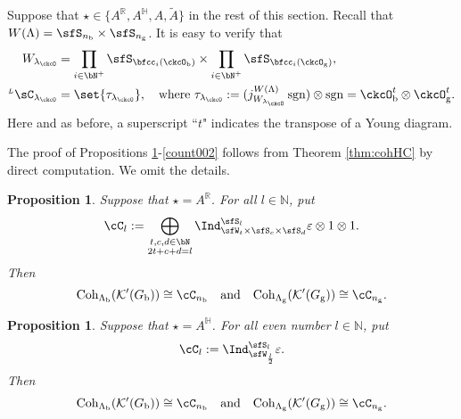 \documentclass[12pt]{amsart}
\newcommand{\BH}{{\mathbb {H}}}
\newcommand{\BN}{{\mathbb {N}}}
\newcommand{\CK}{{\mathcal {K}}}
\newcommand{\sgn}{\operatorname{sgn}}
\newcommand{\R}{\mathbb R}
\numberwithin{equation}{section}
\newtheorem{prop}[thm]{Proposition}
\theoremstyle{remark}
\def\dBV{d_{\mathrm{BV}}}
\def\lamck{\lambda_\ckcO}
\def\LC{{}^{\scriptscriptstyle L}\sC}
\def\LRC{{}^{\scriptscriptstyle LR}\sC}
\def\AND{\quad \text{and} \quad}
\def\Coh{\mathrm{Coh}}
\def\ckcOb{\ckcO_{\mathrm b}}
\def\ckcOg{\ckcO_{\mathrm g}}
\begin{document}


Suppose that $\star\in  \{A^\R, A^\BH, A, \widetilde A\}$ in the rest of this section.
Recall that  $W(\Lambda)  = \sfS_{n_{\mathrm b}}\times \sfS_{n_{\mathrm g}}$. It is easy to verify that
\begin{equation}\label{eq:WA}
  \begin{split}
      W_{\lamck} & = \prod_{i\in \bN^{+}}\sfS_{\bfcc_{i}(\ckcO_{\mathrm b})}\times \prod_{i\in \bN^{+}}\sfS_{\bfcc_{i}(\ckcO_{\mathrm g})},\\
    \LC_{\lamck} & = \set{\tau_{\lamck}}, \quad \textrm{where }  \tau_{\lamck} := (j_{W_{\lamck}}^{W(\Lambda)}\sgn )\otimes \sgn =  \ckcOb^{t}\otimes \ckcOg^{t}.
  \end{split}
\end{equation}
Here and as before, a superscript ``$t$" indicates the transpose of a Young diagram.

  The proof of Propositions \ref{count000}-\ref{count002}  follows from Theorem \ref{thm:cohHC} by direct computation. We  omit the details.

   \begin{prop} \label{count000}
 Suppose that $\star=A^\R$.  For all $l\in \BN$, put
  \[
    \cC_l := \bigoplus_{\substack{t,c,d\in \bN \\2t+c+d=l}} \Ind_{\sfW_t\times \sfS_c\times \sfS_d}^{\sfS_{l}} \varepsilon \otimes 1\otimes 1.
  \]
  Then
  \[
    \Coh_{\Lambda_\mathrm b}(\CK'(G_\mathrm b)) \cong \cC_{n_{\mathrm b}}\quad\textrm{and}\quad   \Coh_{\Lambda_\mathrm g}(\CK'(G_\mathrm g)) \cong \cC_{n_{\mathrm g}}.
  \]
 \end{prop}


\begin{prop}\label{count001}
 Suppose that $\star=A^\BH$.    For all even number $l\in \BN$, put
  \[
  \cC_{l}: =
    \Ind_{\sfW_{\frac{l}{2}}}^{\sfS_{l}}\varepsilon.
  \]
  Then \[
    \Coh_{\Lambda_\mathrm b}(\CK'(G_\mathrm b)) \cong \cC_{n_{\mathrm b}}\quad\textrm{and}\quad   \Coh_{\Lambda_\mathrm g}(\CK'(G_\mathrm g)) \cong \cC_{n_{\mathrm g}}.
   \]

\end{prop}
\end{document}
